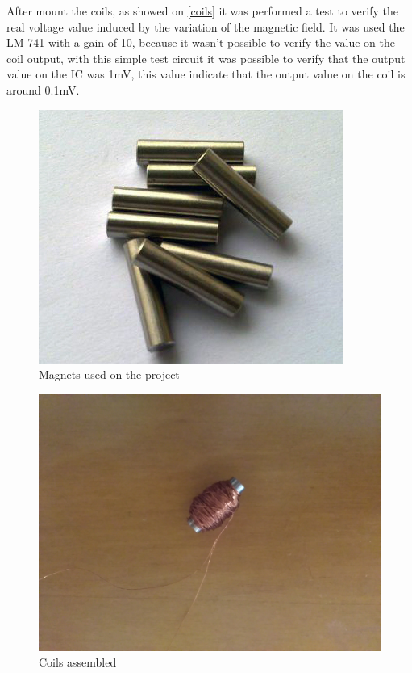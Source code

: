 After mount the coils, as showed on \autoref{coils} it was performed a test to verify the real voltage value induced by
the variation of the magnetic field. It was used the LM 741 \cite{LM741} with a gain of 10,
because it wasn't possible to verify the value on the coil output, with this simple test circuit
it was possible to verify that the output value on the IC was 1mV, this value indicate that the
output value on the coil is around 0.1mV. \\

\begin{figure}[!htpb]
  \centering
  \caption{Magnets used on the project}
  \label{magnets}
  \includegraphics[scale=0.3]{images/magnets}
\end{figure}

\begin{figure}[!htpb]
  \centering
  \caption{Coils assembled}
  \label{coils}
  \includegraphics[scale=0.08]{images/coils}
\end{figure}

